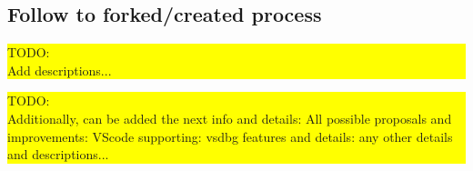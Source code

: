 \documentclass[a4paper,12pt]{article}
\begin{document}
\subsection{Follow to forked/created process}
\begin{frame}{\bfseries\colorbox{yellow}{\parbox{12cm}{TODO: \\
Add descriptions...}}}\end{frame}

\begin{frame}{\bfseries\colorbox{yellow}{\parbox{12cm}{TODO: \\
Additionally, can be added the next info and details:
All possible proposals and improvements:
VScode supporting:
vsdbg features and details:
any other details and descriptions...}}}\end{frame}

\printindex[notion]
\printindex
\end{document}
